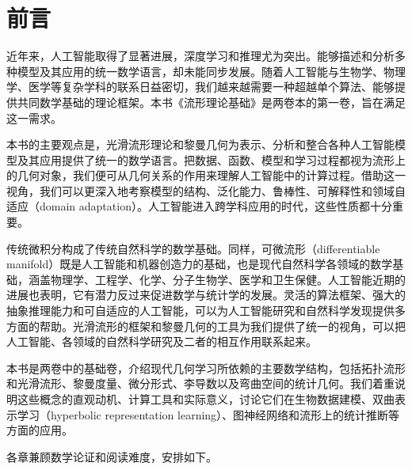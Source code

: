 \tableofcontents

\chapter*{前言}
近年来，人工智能取得了显著进展，深度学习和推理尤为突出。能够描述和分析多种模型及其应用的统一数学语言，却未能同步发展。随着人工智能与生物学、物理学、医学等复杂学科的联系日益密切，我们越来越需要一种超越单个算法、能够提供共同数学基础的理论框架。本书《流形理论基础》是两卷本的第一卷，旨在满足这一需求。

本书的主要观点是，光滑流形理论和黎曼几何为表示、分析和整合各种人工智能模型及其应用提供了统一的数学语言。把数据、函数、模型和学习过程都视为流形上的几何对象，我们便可从几何关系的作用来理解人工智能中的计算过程。借助这一视角，我们可以更深入地考察模型的结构、泛化能力、鲁棒性、可解释性和领域自适应（domain adaptation）。人工智能进入跨学科应用的时代，这些性质都十分重要。

传统微积分构成了传统自然科学的数学基础。同样，可微流形（differentiable manifold）既是人工智能和机器创造力的基础，也是现代自然科学各领域的数学基础，涵盖物理学、工程学、化学、分子生物学、医学和卫生保健。人工智能近期的进展也表明，它有潜力反过来促进数学与统计学的发展。灵活的算法框架、强大的抽象推理能力和可自适应的人工智能，可以为人工智能研究和自然科学发现提供多方面的帮助。光滑流形的框架和黎曼几何的工具为我们提供了统一的视角，可以把人工智能、各领域的自然科学研究及二者的相互作用联系起来。

本书是两卷中的基础卷，介绍现代几何学习所依赖的主要数学结构，包括拓扑流形和光滑流形、黎曼度量、微分形式、李导数以及弯曲空间的统计几何。我们着重说明这些概念的直观动机、计算工具和实际意义，讨论它们在生物数据建模、双曲表示学习（hyperbolic representation learning）、图神经网络和流形上的统计推断等方面的应用。

各章兼顾数学论证和阅读难度，安排如下。

